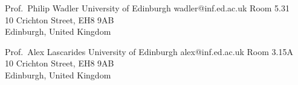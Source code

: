 \cvref
{Prof.\ Philip Wadler}
{University of Edinburgh}
{wadler@inf.ed.ac.uk}
{Room 5.31\\10 Crichton Street, EH8 9AB\\Edinburgh, United Kingdom}

\divider

\cvref
{Prof.\ Alex Lascarides}
{University of Edinburgh}
{alex@inf.ed.ac.uk}
{Room 3.15A\\10 Crichton Street, EH8 9AB\\Edinburgh, United Kingdom}
